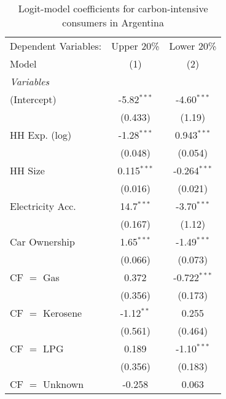 
\begin{table}[htbp!]
   \centering
   \small
   \begin{adjustbox}{width = 1\textwidth, max height = 0.95\textheight, center}
      \begin{threeparttable}[b]
         \caption{\label{tab:Logit_1_ARG} Logit-model coefficients for carbon-intensive consumers in Argentina}
         \begin{tabular}{lcc}
            \tabularnewline \midrule \midrule
            Dependent Variables: & Upper 20\%     & Lower 20\%\\   
            Model                & (1)            & (2)\\  
            \midrule
            \emph{Variables}\\
            (Intercept)          & -5.82$^{***}$  & -4.60$^{***}$\\   
                                 & (0.433)        & (1.19)\\   
            HH Exp. (log)        & -1.28$^{***}$  & 0.943$^{***}$\\   
                                 & (0.048)        & (0.054)\\   
            HH Size              & 0.115$^{***}$  & -0.264$^{***}$\\   
                                 & (0.016)        & (0.021)\\   
            Electricity Acc.     & 14.7$^{***}$   & -3.70$^{***}$\\   
                                 & (0.167)        & (1.12)\\   
            Car Ownership        & 1.65$^{***}$   & -1.49$^{***}$\\   
                                 & (0.066)        & (0.073)\\   
            CF $=$ Gas           & 0.372          & -0.722$^{***}$\\   
                                 & (0.356)        & (0.173)\\   
            CF $=$ Kerosene      & -1.12$^{**}$   & 0.255\\   
                                 & (0.561)        & (0.464)\\   
            CF $=$ LPG           & 0.189          & -1.10$^{***}$\\   
                                 & (0.356)        & (0.183)\\   
            CF $=$ Unknown       & -0.258         & 0.063\\   

\end{tabular}
\end{threeparttable}
\end{adjustbox}
\end{table}
